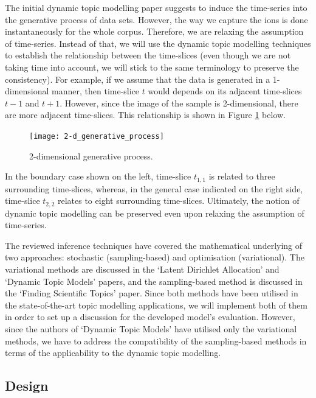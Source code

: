 \documentclass{mprop}
\begin{document}
The initial dynamic topic modelling paper suggests to induce the time-series into the generative process of data sets. However, the way we capture the ions is done instantaneously for the whole corpus. Therefore, we are relaxing the assumption of time-series. Instead of that, we will use the dynamic topic modelling techniques to establish the relationship between the time-slices (even though we are not taking time into account, we will stick to the same terminology to preserve the consistency). For example, if we assume that the data is generated in a 1-dimensional manner, then time-slice $t$ would depends on its adjacent time-slices $t-1$ and $t+1$. However, since the image of the sample is 2-dimensional, there are more adjacent time-slices. This relationship is shown in Figure \ref{fig:2-d_generative_process} below.
\begin{figure}[H]
  \centering
  \texttt{[image: 2-d\_generative\_process]}
  \caption{2-dimensional generative process.}
  \label{fig:2-d_generative_process}
\end{figure}
In the boundary case shown on the left, time-slice $t_{1,1}$ is related to three surrounding time-slices, whereas, in the general case indicated on the right side, time-slice $t_{2,2}$ relates to eight surrounding time-slices. Ultimately, the notion of dynamic topic modelling can be  preserved even upon relaxing the assumption of time-series.

\par The reviewed inference techniques have covered the mathematical underlying of two approaches: stochastic (sampling-based) and optimisation (variational). The variational methods are discussed in the `Latent Dirichlet Allocation' and `Dynamic Topic Models' papers, and the sampling-based method is discussed in the `Finding Scientific Topics' paper. Since both methods have been utilised in the state-of-the-art topic modelling applications, we will implement both of them in order to set up a discussion for the developed model's evaluation. However, since the authors of `Dynamic Topic Models' have utilised only the variational methods, we have to address the compatibility of the sampling-based methods in terms of the applicability to the dynamic topic modelling.


\subsection{Design}
\end{document}
